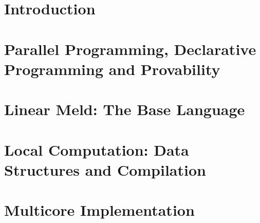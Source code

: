 \documentclass[12pt]{cmuthesis}
\theoremstyle{indented}
\begin{document}

\thispagestyle{empty}
\clearpage

\frontmatter


\begin{acknowledgments}

\end{acknowledgments}

\tableofcontents
\listoffigures
\listoftables
\renewcommand{\listtheoremname}{List of Equations}
\listoftheorems

\mainmatter


%
%
%
%
%

\mainmatter
\chapter{Introduction}


\chapter{Parallel Programming, Declarative Programming and Provability}


\chapter{Linear Meld: The Base Language}



\chapter{Local Computation: Data Structures and Compilation}\label{chapter:local}

\chapter{Multicore Implementation}\label{chapter:implementation}

\end{document}
